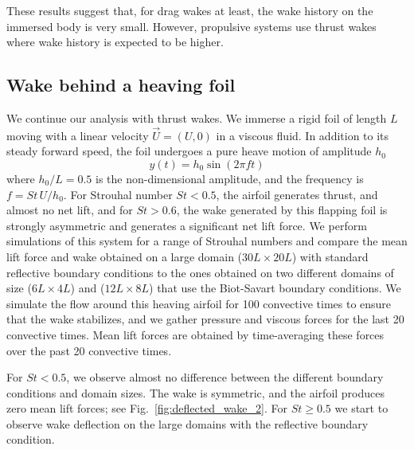 \documentclass[preprint,12pt]{elsarticle}
\begin{document}
These results suggest that, for drag wakes at least, the wake history on the immersed body is very small. However, propulsive systems use thrust wakes where wake history is expected to be higher.

\subsection{Wake behind a heaving foil}

We continue our analysis with thrust wakes. We immerse a rigid foil of length $L$ moving with a linear velocity $\vec{U}=(U,0)$ in a viscous fluid. In addition to its steady forward speed, the foil undergoes a pure heave motion of amplitude $h_0$
\begin{equation}
    y(t) = h_0 \sin(2\pi f t)
\end{equation}
where $h_0/L=0.5$ is the non-dimensional amplitude, and the frequency is $f = St\,U/h_0$. For Strouhal number $St<0.5$, the airfoil generates thrust, and almost no net lift, and for $St>0.6$, the wake generated by this flapping foil is strongly asymmetric and generates a significant net lift force. We perform simulations of this system for a range of Strouhal numbers and compare the mean lift force and wake obtained on a large domain ($30L\times20L$) with standard reflective boundary conditions to the ones obtained on two different domains of size ($6L\times4L$) and ($12L\times8L$) that use the Biot-Savart boundary conditions. We simulate the flow around this heaving airfoil for 100 convective times to ensure that the wake stabilizes, and we gather pressure and viscous forces for the last 20 convective times. Mean lift forces are obtained by time-averaging these forces over the past 20 convective times.

For $St<0.5$, we observe almost no difference between the different boundary conditions and domain sizes. The wake is symmetric, and the airfoil produces zero mean lift forces; see Fig.~\ref{fig:deflected_wake_2}. For $St\ge 0.5$ we start to observe wake deflection on the large domains with the reflective boundary condition.
\end{document}
